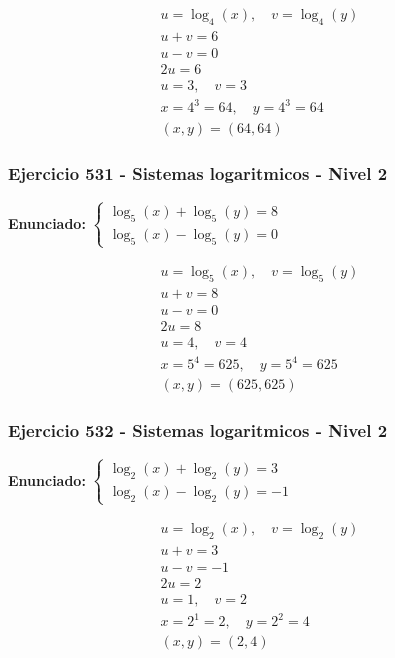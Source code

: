\documentclass[12pt,a4paper]{article}
\begin{document}
\[
\begin{aligned}
u=\log_{4}\left(x\right),\quad v=\log_{4}\left(y\right)\\
u+v=6\\
u-v=0\\
2u=6\\
u=3,\quad v=3\\
x=4^{3}=64,\quad y=4^{3}=64\\
\boxed{(x,y)=(64,64)}
\end{aligned}
\]


\subsubsection*{Ejercicio 531 - Sistemas logaritmicos - Nivel 2}
\textbf{Enunciado:} \(\begin{cases} \log_{5}\left(x\right)+\log_{5}\left(y\right)=8\\ \log_{5}\left(x\right)-\log_{5}\left(y\right)=0\end{cases}\)

\[
\begin{aligned}
u=\log_{5}\left(x\right),\quad v=\log_{5}\left(y\right)\\
u+v=8\\
u-v=0\\
2u=8\\
u=4,\quad v=4\\
x=5^{4}=625,\quad y=5^{4}=625\\
\boxed{(x,y)=(625,625)}
\end{aligned}
\]


\subsubsection*{Ejercicio 532 - Sistemas logaritmicos - Nivel 2}
\textbf{Enunciado:} \(\begin{cases} \log_{2}\left(x\right)+\log_{2}\left(y\right)=3\\ \log_{2}\left(x\right)-\log_{2}\left(y\right)=-1\end{cases}\)

\[
\begin{aligned}
u=\log_{2}\left(x\right),\quad v=\log_{2}\left(y\right)\\
u+v=3\\
u-v=-1\\
2u=2\\
u=1,\quad v=2\\
x=2^{1}=2,\quad y=2^{2}=4\\
\boxed{(x,y)=(2,4)}
\end{aligned}
\]
\end{document}
